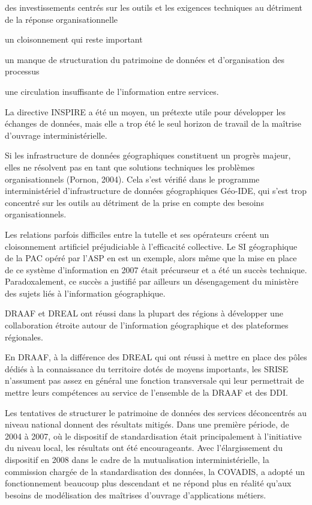\subject{Constats}

{\it

\startitemize[a,packed]

\item des investissements centrés sur les outils et les exigences techniques au
détriment de la réponse organisationnelle

\item un cloisonnement qui reste important

\item un manque de structuration du patrimoine de données et d'organisation des
processus

\item une circulation insuffisante de l'information entre services.

\stopitemize}

La directive INSPIRE a été un moyen, un prétexte utile pour développer les
échanges de données, mais elle a trop été le seul horizon de travail de la
maîtrise d'ouvrage interministérielle.

Si les infrastructure de données géographiques constituent un progrès majeur,
elles ne résolvent pas en tant que solutions techniques les problèmes
organisationnels (Pornon, 2004). Cela s'est vérifié dans le programme
interministériel d'infrastructure de données géographiques Géo-IDE, qui s'est
trop concentré sur les outils au détriment de la prise en compte des besoins
organisationnels.

Les relations parfois difficiles entre la tutelle et ses opérateurs créent un
cloisonnement artificiel préjudiciable à l'efficacité collective. Le SI
géographique de la PAC opéré par l'ASP en est un exemple, alors même que la
mise en place de ce système d'information en 2007 était précurseur et a été un
succès technique. Paradoxalement, ce succès a justifié par ailleurs un
désengagement du ministère des sujets liés à l'information géographique.

DRAAF et DREAL ont réussi dans la plupart des régions à
développer une collaboration étroite autour de l'information géographique et
des plateformes régionales.

En DRAAF, à la différence des DREAL qui ont réussi à mettre en place des pôles
dédiés à la connaissance du territoire dotés de moyens importants, les SRISE
n'assument pas assez en général une fonction transversale qui leur permettrait
de mettre leurs compétences au service de l'ensemble de la DRAAF et des DDI.

Les tentatives de structurer le patrimoine de données des services
déconcentrés au niveau national donnent des résultats mitigés. Dans une
première période, de 2004 à 2007, où le dispositif de standardisation était
principalement à l'initiative du niveau local, les résultats ont été
encourageants. Avec l'élargissement du dispositif en 2008 dans le cadre de la
mutualisation interministérielle, la commission chargée de la standardisation
des données, la COVADIS, a adopté un fonctionnement beaucoup plus descendant
et ne répond plus en réalité qu'aux besoins de modélisation des maîtrises
d'ouvrage d'applications métiers.

